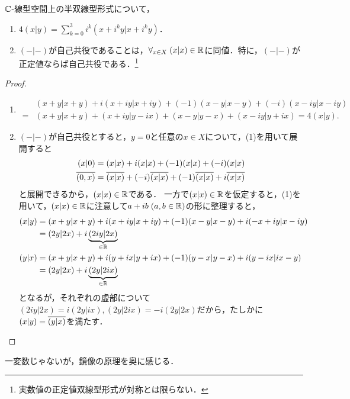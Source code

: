 \documentclass[uplatex,dvipdfmx]{jsreport}
\begin{document}
\begin{lemma}[自己共役性の特徴付け]\label{lemma-characterization-of-self-adjointness}
    $\mathbb{C}$-線型空間上の半双線型形式について，
    \begin{enumerate}
        \item $4(x|y)=\sum^3_{k=0}i^k(x+i^ky|x+i^ky)$．
        \item $(-|-)$が自己共役であることは，$\forall_{x\in X}\;(x|x)\in\mathbb{R}$に同値．特に，$(-|-)$が正定値ならば自己共役である．\footnote{実数値の正定値双線型形式が対称とは限らない．}
    \end{enumerate}
\end{lemma}
\begin{proof}\mbox{}
    \begin{enumerate}
        \item \begin{align*}
            &(x+y|x+y)+i(x+iy|x+iy)+(-1)(x-y|x-y)+(-i)(x-iy|x-iy)\\
            =&(x+y|x+y)+(x+iy|y-ix)+(x-y|y-x)+(x-iy|y+ix)=4(x|y).
        \end{align*}
        \item $(-|-)$が自己共役とすると，$y=0$と任意の$x\in X$について，(1)を用いて展開すると
        \begin{align*}
            (x|0)&=(x|x)+i(x|x)+(-1)(x|x)+(-i)(x|x)\\
            \overline{(0,x)}&=\overline{(x|x)}+(-i)\overline{(x|x)}+(-1)\overline{(x|x)}+i\overline{(x|x)}
        \end{align*}
        と展開できるから，$(x|x)\in\mathbb{R}$である．
        一方で$(x|x)\in\mathbb{R}$を仮定すると，(1)を用いて，$(x|x)\in\mathbb{R}$に注意して$a+ib\;(a,b\in\mathbb{R})$の形に整理すると，
        \begin{align*}
            (x|y)&=(x+y|x+y)+i(x+iy|x+iy)+(-1)(x-y|x-y)+i(-x+iy|x-iy)\\
            &=(2y|2x)+i\underbrace{(2iy|2x)}_{\in\mathbb{R}}\\
            (y|x)&=(x+y|x+y)+i(y+ix|y+ix)+(-1)(y-x|y-x)+i(y-ix|ix-y)\\
            &=(2y|2x)+i\underbrace{(2y|2ix)}_{\in\mathbb{R}}
        \end{align*}
        となるが，それぞれの虚部について$(2iy|2x)=i(2y|ix),(2y|2ix)=-i(2y|2x)$だから，たしかに$(x|y)=\overline{(y|x)}$を満たす．
    \end{enumerate}
\end{proof}
\begin{remarks}
    一変数じゃないが，鏡像の原理を奥に感じる．
\end{remarks}
\end{document}
